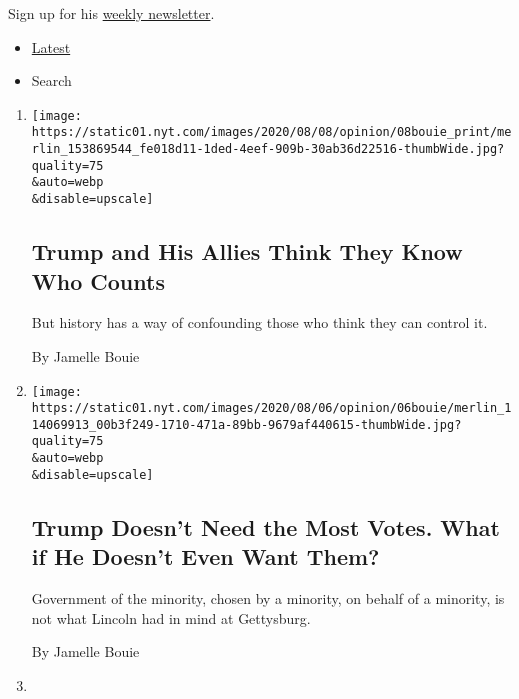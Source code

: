 Sign up for his
\href{https://www.nytimes.com/newsletters/jamellebouie}{weekly
newsletter}.

\begin{itemize}
\tightlist
\item
  \protect\hyperlink{stream-panel}{Latest}
\item
  Search
\end{itemize}

\begin{enumerate}
\def\labelenumi{\arabic{enumi}.}
\item
  \href{/2020/08/07/opinion/trump-2020-census.html}{}

  \texttt{[image: https://static01.nyt.com/images/2020/08/08/opinion/08bouie\_print/merlin\_153869544\_fe018d11-1ded-4eef-909b-30ab36d22516-thumbWide.jpg?quality=75\\\&auto=webp\\\&disable=upscale]}

  \hypertarget{trump-and-his-allies-think-they-know-who-counts}{%
  \subsection{Trump and His Allies Think They Know Who
  Counts}\label{trump-and-his-allies-think-they-know-who-counts}}

  But history has a way of confounding those who think they can control
  it.

  By Jamelle Bouie
\item
  \href{/2020/08/04/opinion/trump-2020-electoral-college.html}{}

  \texttt{[image: https://static01.nyt.com/images/2020/08/06/opinion/06bouie/merlin\_114069913\_00b3f249-1710-471a-89bb-9679af440615-thumbWide.jpg?quality=75\\\&auto=webp\\\&disable=upscale]}

  \hypertarget{trump-doesnt-need-the-most-votes-what-if-he-doesnt-even-want-them}{%
  \subsection{Trump Doesn't Need the Most Votes. What if He Doesn't Even
  Want
  Them?}\label{trump-doesnt-need-the-most-votes-what-if-he-doesnt-even-want-them}}

  Government of the minority, chosen by a minority, on behalf of a
  minority, is not what Lincoln had in mind at Gettysburg.

  By Jamelle Bouie
\item
  \href{/2020/07/31/opinion/sunday/john-lewis-trump-election-2020.html}{}


\end{enumerate}
